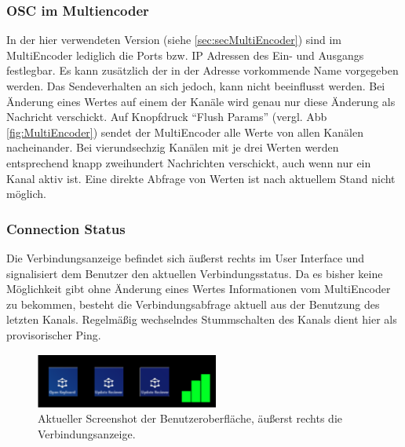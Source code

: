 \documentclass[11pt, titlepage, fleqn]{report}
\begin{document}
                \subsubsection{OSC im Multiencoder}
                    In der hier verwendeten Version (siehe \ref{sec:secMultiEncoder}) sind im MultiEncoder lediglich die Ports bzw. IP Adressen des 
                    Ein- und Ausgangs festlegbar. Es kann zusätzlich der in der Adresse vorkommende Name vorgegeben werden. 
                    Das Sendeverhalten an sich jedoch, kann nicht beeinflusst werden. Bei Änderung eines Wertes auf einem der 
                    Kanäle wird genau nur diese Änderung als Nachricht verschickt. Auf Knopfdruck “Flush Params” (vergl. Abb \ref{fig:MultiEncoder}) sendet der MultiEncoder 
                    alle Werte von allen Kanälen nacheinander. Bei vierundsechzig Kanälen mit je drei Werten werden entsprechend knapp 
                    zweihundert Nachrichten verschickt, auch wenn nur ein Kanal aktiv ist. Eine direkte Abfrage von Werten ist nach 
                    aktuellem Stand nicht möglich.
                    \pagebreak
                \subsubsection{Connection Status}
                    Die Verbindungsanzeige befindet sich äußerst rechts im User Interface und signalisiert dem Benutzer den aktuellen Verbindungsstatus. 
                    Da es bisher keine Möglichkeit gibt ohne Änderung eines 
                    Wertes Informationen vom MultiEncoder zu bekommen, besteht 
                    die Verbindungsabfrage aktuell aus der Benutzung des 
                    letzten Kanals. Regelmäßig wechselndes Stummschalten des 
                    Kanals dient hier als provisorischer Ping.
                    \begin{figure}[htbp]
                        \centering
                        \includegraphics[width=6cm]{./img/status.png}
                        \caption[Die Verbindungsanzeige in der Benutzeroberfläche]{ Aktueller Screenshot der Benutzeroberfläche, äußerst rechts die Verbindungsanzeige.
                        \label{fig:status}}
                    \end{figure} 
\end{document}
